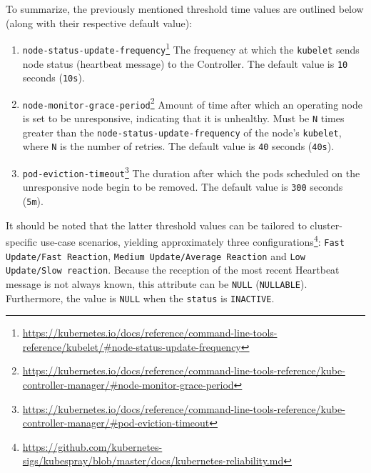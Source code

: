 \begin{itemize}
    To summarize, the previously mentioned threshold time values are outlined
    below (along with their respective default value):
    \begin{enumerate}
      \item \texttt{node-status-update-frequency}\footnote{\url{https://kubernetes.io/docs/reference/command-line-tools-reference/kubelet/\#node-status-update-frequency}}
        \newline
        The frequency at which the \texttt{kubelet} sends node status (heartbeat
        message) to the Controller.
        \newline
        The default value is \texttt{10} seconds (\texttt{10s}).

      \item \texttt{node-monitor-grace-period}\footnote{\url{https://kubernetes.io/docs/reference/command-line-tools-reference/kube-controller-manager/\#node-monitor-grace-period}}
        \newline
        Amount of time after which an operating node is set to be unresponsive, indicating
        that it is unhealthy. Must be \texttt{N} times greater than the \texttt{node-status-update-frequency}
        of the node's \texttt{kubelet}, where \texttt{N} is the number of retries.
        \newline
        The default value is \texttt{40} seconds (\texttt{40s}).

      \item \texttt{pod-eviction-timeout}\footnote{\url{https://kubernetes.io/docs/reference/command-line-tools-reference/kube-controller-manager/\#pod-eviction-timeout}}
        \newline
        The duration after which the pods scheduled on the unresponsive node
        begin to be removed.
        \newline
        The default value is \texttt{300} seconds (\texttt{5m}).
    \end{enumerate}
    It should be noted that the latter threshold values can be tailored to cluster-specific
    use-case scenarios, yielding approximately three configurations\footnote{\url{https://github.com/kubernetes-sigs/kubespray/blob/master/docs/kubernetes-reliability.md}}:
    \texttt{Fast Update/Fast Reaction}, \texttt{Medium Update/Average Reaction}
    and \texttt{Low Update/Slow reaction}.
    \newline
    Because the reception of the most recent Heartbeat message is not always
    known, this attribute can be \texttt{NULL} (\texttt{NULLABLE}). Furthermore,
    the value is \texttt{NULL} when the \texttt{status} is \texttt{INACTIVE}.


\end{itemize}
